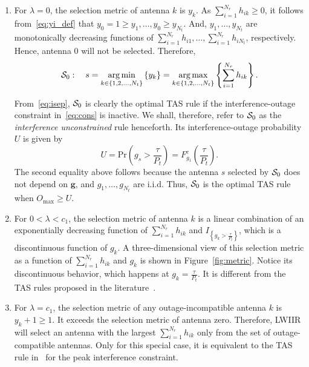 \documentclass[12pt,draftcls,peerreview,onecolumn]{IEEEtran}
\newcommand{\brac}[1]{\left({#1}\right)}
\newcommand{\cbrac}[1]{\left\{{#1}\right\}}
\newcommand{\indic}[1]{I_{\cbrac{#1}}}
\newcommand{\ie}{{i.e.}}
\newcommand{\prob}[1]{\text{Pr}\brac{#1}}
\DeclareMathOperator*{\argmin}{arg\,min}
\DeclareMathOperator*{\argmax}{arg\,max}
\newcommand{\nx}{{0}}
\newcommand{\lam}{\lambda}
\newcommand{\Nt}{{N_t}}
\newcommand{\Nr}{{N_r}}
\newcommand{\Pt}{{P_t}}
\newcommand{\such}{h}
\newcommand{\puch}{g}
\newcommand{\hk}[1]{{\such_{#1}}}
\newcommand{\gk}[1]{{\puch_{#1}}}
\newcommand{\g}{\mathbf{\puch}}
\newcommand{\outmax}{O_{\text{max}}}
\newcommand{\itau}{\tau}
\newcommand{\cone}{c_{1}}
\newcommand{\taubypt}{\frac{\itau}{\Pt}}
\newcommand{\gkgrtaubypt}[1]{{\gk{#1}}>\taubypt}
\newcommand{\yk}[1]{y_{#1}}
\newcommand{\un}{U}
\newcommand{\antopts}{\left\{1,2,\ldots,\Nt\right\}}
\newcommand{\caluncons}{{\cal S_{\text{0}}}}
\newcommand{\sumnr}{\sum_{i=1}^{\Nr}}
\begin{document}
\begin{enumerate}
\item For $\lam=0$, the selection metric of antenna $k$ is $\yk{k}$. As $\sumnr\hk{ik}\geq 0$, it follows from~\eqref{eq:yi_def} that $\yk{0}=1\geq\yk{1},\ldots,\yk{0}\geq\yk{\Nt}$. And,   $\yk{1},\ldots,\yk{\Nt}$ are monotonically decreasing functions of $\sumnr\hk{i1},\ldots,\sumnr\hk{i\Nt}$, respectively. Hence, antenna $\nx$ will not be selected. Therefore, 
\begin{equation}
\caluncons:\quad s = \argmin\limits_{k\in\antopts} \left\{ \yk{k} \right\} = \argmax\limits_{k\in\antopts} \left\{\sumnr \hk{ik} \right\}.
\label{eq:uncons_simple}
\end{equation}

From~\eqref{eq:isep}, $\caluncons$ is clearly the optimal TAS rule if the interference-outage constraint in~\eqref{eq:cons} is inactive. We shall, therefore, refer to $\caluncons$ as the {\em interference unconstrained} rule henceforth. Its interference-outage probability $\un$ is given by
%
\begin{equation}
\un= \prob{\gk{s}>\taubypt}= F^c_{\gk{1}}\!\!\left({\taubypt}\right).
\label{eq:uncomsoutage}
\end{equation}
%
The second equality above follows because the antenna $s$ selected by $\caluncons$ does not depend on $\g$, and $\gk{1},\ldots,\gk{\Nt}$ are i.i.d. Thus, $\caluncons$ is the optimal TAS rule when $\outmax \geq \un$. 

\item For $0<\lam<\cone$, the selection metric of antenna $k$ is a linear combination of  an exponentially decreasing function of $\sumnr\hk{ik}$ and $\indic{\gkgrtaubypt{k}}$, which is a discontinuous function of $\gk{k}$. A three-dimensional view of this selection metric as a function of $\sumnr\hk{ik}$ and $\gk{k}$ is shown in Figure~\ref{fig:metric}. Notice its discontinuous behavior, which happens at $\gk{k}=\taubypt$. It is different from the TAS rules proposed in the literature~\cite{Fakhan_2014_TSP,Wang_2010_TWC,Wang_2011_TCom,Sarvendranath_2013_TCOM,Sarvendranath_2014_TCOM}.

\item For $\lam=\cone$, the selection metric of any outage-incompatible antenna $k$ is  $\yk{k}+1\geq 1$. It exceeds the selection metric of antenna zero. Therefore, LWIIR will select an antenna with the largest $\sumnr\hk{ik}$ only from the set of outage-compatible antennas. Only for this special case, it is equivalent to the TAS rule in~\cite{Hanif_2015_globecom}  for the peak interference constraint.


\end{enumerate}
\end{document}
